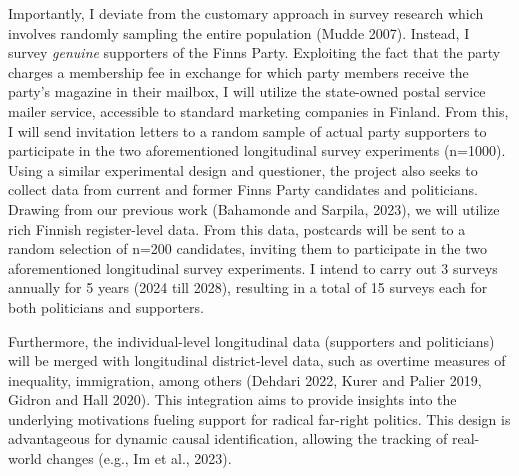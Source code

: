 \documentclass[letterpaper]{article}
\begin{document}
\vspace{2mm}Importantly, I deviate from the customary approach in survey research which involves randomly sampling the entire population (Mudde 2007). Instead, I survey \emph{genuine} supporters of the Finns Party. Exploiting the fact that the party charges a membership fee in exchange for which party members receive the party's magazine in their mailbox, I will utilize the state-owned postal service mailer service, accessible to standard marketing companies in Finland. From this, I will send invitation letters to a random sample of actual party supporters to participate in the two aforementioned longitudinal survey experiments (n=1000). Using a similar experimental design and questioner, the project also seeks to collect data from current and former Finns Party candidates and politicians. Drawing from our previous work (Bahamonde and Sarpila, 2023), we will utilize rich Finnish register-level data. From this data, postcards will be sent to a random selection of n=200 candidates, inviting them to participate in the two aforementioned longitudinal survey experiments. I intend to carry out 3 surveys annually for 5 years (2024 till 2028), resulting in a total of 15 surveys each for both politicians and supporters.

\vspace{2mm}Furthermore, the individual-level longitudinal data (supporters and politicians) will be merged with longitudinal district-level data, such as overtime measures of inequality, immigration, among others (Dehdari 2022, Kurer and Palier 2019, Gidron and Hall 2020). This integration aims to provide insights into the underlying motivations fueling support for radical far-right politics. This design is advantageous for dynamic causal identification, allowing the tracking of real-world changes (e.g., Im et al., 2023).

\end{document}
